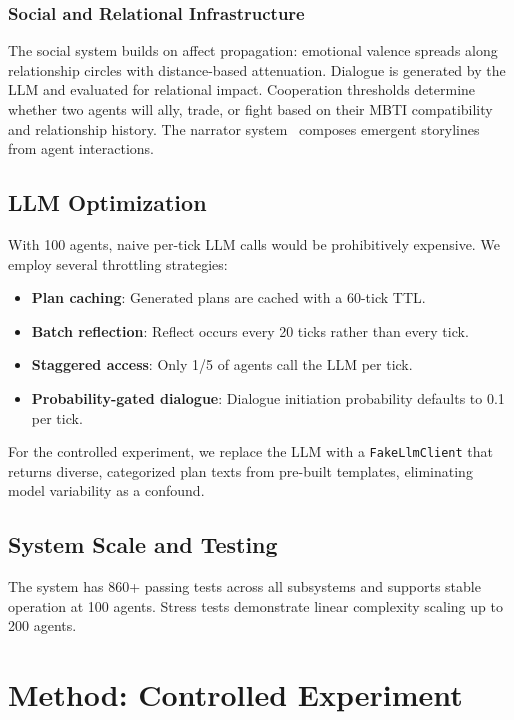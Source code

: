 \documentclass[11pt]{article}
\begin{document}
\subsubsection{Social and Relational Infrastructure}
The social system builds on affect propagation: emotional valence spreads along relationship circles with distance-based attenuation.
Dialogue is generated by the LLM and evaluated for relational impact.
Cooperation thresholds determine whether two agents will ally, trade, or fight based on their MBTI compatibility and relationship history.
The narrator system~\cite{niu2026seduced} composes emergent storylines from agent interactions.

\subsection{LLM Optimization}

With 100 agents, naive per-tick LLM calls would be prohibitively expensive.
We employ several throttling strategies:
\begin{itemize}[leftmargin=*,nosep]
    \item \textbf{Plan caching}: Generated plans are cached with a 60-tick TTL.
    \item \textbf{Batch reflection}: Reflect occurs every 20 ticks rather than every tick.
    \item \textbf{Staggered access}: Only 1/5 of agents call the LLM per tick.
    \item \textbf{Probability-gated dialogue}: Dialogue initiation probability defaults to 0.1 per tick.
\end{itemize}
For the controlled experiment, we replace the LLM with a \texttt{FakeLlmClient} that returns diverse, categorized plan texts from pre-built templates, eliminating model variability as a confound.

\subsection{System Scale and Testing}

The system has 860+ passing tests across all subsystems and supports stable operation at 100 agents. Stress tests demonstrate linear complexity scaling up to 200 agents.

\section{Method: Controlled Experiment}
\label{sec:method}
\end{document}
